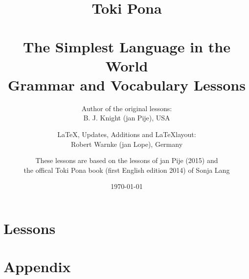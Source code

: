 \documentclass[a4paper, 10pt]{book}
\begin{document}
\setlength{\topmargin}{-19mm}
\setlength{\headheight}{5mm}
\setlength{\headsep}{10mm}
\setlength{\textheight}{245mm}
\setlength{\textwidth}{155mm}
\setlength{\oddsidemargin}{5mm}
\setlength{\evensidemargin}{-1mm}
\setlength{\footskip}{20mm}
\setlength{\parindent}{0mm}
\setlength{\parskip}{2.0ex plus 1.0ex minus 0.5ex}
\batchmode
\title{
Toki Pona \\  \\ 
The Simplest Language in the World \\ 
Grammar and Vocabulary Lessons \\
}
\author{
Author of the original lessons: \\ B. J. Knight (jan Pije), USA \cite{www:Pije:01} \\  
\and
\LaTeX, Updates, Additions and \LaTeX layout: \\ Robert Warnke (jan Lope), Germany \cite{www:rowa:01} \\ 
\and
These lessons are based on the lessons of jan Pije (2015) and \\ 
the offical Toki Pona book (first English edition 2014) of Sonja Lang \cite{www:tokipona.org} 
}

%
\date
\today
\maketitle
\tableofcontents
%
\chapter{Lessons}




















%


%
\appendix
\chapter{Appendix}
%
%







%


\printindex
\end{document}
